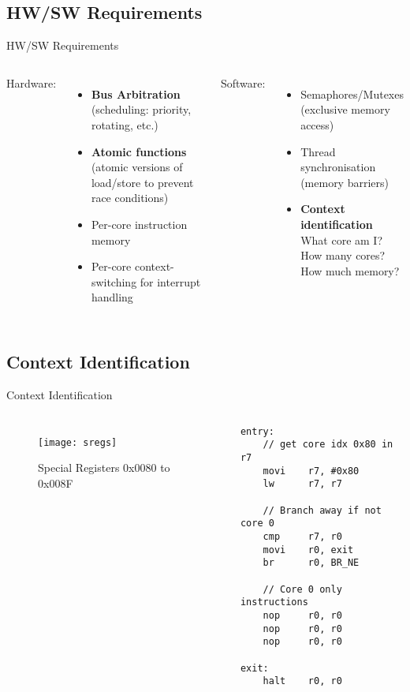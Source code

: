 \documentclass[aspectratio=169]{beamer}
\begin{document}
\subsection{HW/SW Requirements}
\begin{frame}{HW/SW Requirements}
\begin{columns}[t]
Hardware:
\begin{itemize}[<+->]
    \item \textbf{Bus Arbitration}\\ (scheduling: priority, rotating, etc.)
    \item \textbf{Atomic functions}\\ (atomic versions of load/store to prevent race conditions)
    \item Per-core instruction memory
    \item Per-core context-switching for interrupt handling
\end{itemize}
Software:
\begin{itemize}[<+->]
    \item Semaphores/Mutexes\\ (exclusive memory access)
    \item Thread synchronisation\\ (memory barriers)
    \item \textbf{Context identification}\\ What core am I?\\ How many cores?\\ How much memory?
\end{itemize}
\end{columns}
\end{frame}

\subsection{Context Identification}
\begin{frame}[fragile]{Context Identification}
\begin{columns}
\begin{figure}
\texttt{[image: sregs]}
\caption{Special Registers 0x0080 to 0x008F}
\end{figure}
\begin{lstlisting}[basicstyle=\scriptsize]
entry:
    // get core idx 0x80 in r7
    movi    r7, #0x80
    lw      r7, r7

    // Branch away if not core 0
    cmp     r7, r0
    movi    r0, exit
    br      r0, BR_NE 
    
    // Core 0 only instructions
    nop     r0, r0
    nop     r0, r0
    nop     r0, r0
    
exit:
    halt    r0, r0    
\end{lstlisting}
\end{columns}
\end{frame}
\end{document}
